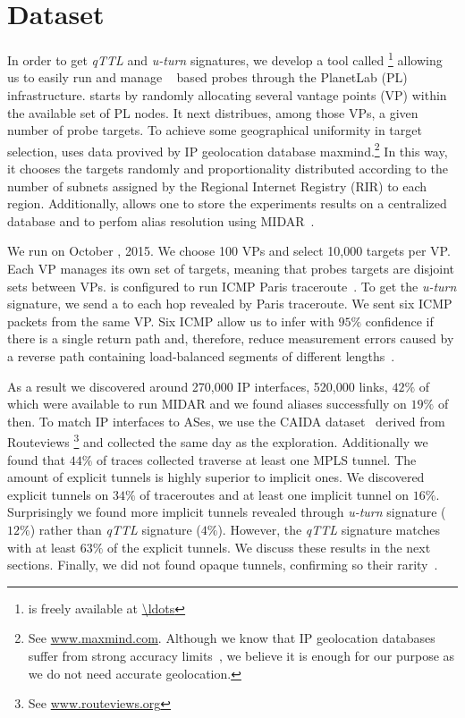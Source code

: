 \section{Dataset}\label{dataset}
In order to get \textit{qTTL} and \textit{u-turn} signatures, we develop a tool
called \magallanes\footnote{\magallanes is freely available at \url{\ldots}}
allowing us to easily run and manage \scamper~\cite{Luckie10} based probes
through the PlanetLab (PL) infrastructure.  \magallanes starts by randomly
allocating several vantage points (VP) within the available set of PL nodes.  It
next distribues, among those VPs, a given number of probe targets.
To achieve some geographical uniformity in target selection, \magallanes uses
data provived by IP geolocation database maxmind.\footnote{See
\url{www.maxmind.com}.  Although we know that IP geolocation databases suffer
from strong accuracy limits~\cite{geolocation}, we believe it is enough for our
purpose as we do not need accurate geolocation.}  In this way, it chooses the
targets randomly and proportionality distributed according to the number of
subnets assigned by the Regional Internet Registry (RIR) to each region.
Additionally, \magallanes allows one to store the experiments results on a
centralized database and to perfom alias resolution using MIDAR~\cite{Keys13}.

We run \magallanes on October , 2015.  We choose 100 VPs and select
10,000 targets per VP.  Each VP manages its own set of targets, meaning that
probes targets are disjoint sets between VPs.  \scamper is configured to run
ICMP Paris traceroute~\cite{BRICE06}.  To get the \textit{u-turn} signature,
we send a \ping to each hop revealed by Paris traceroute. We sent six
ICMP \echorequest packets from the same VP.  Six ICMP \echoreply allow us to
infer with $95\%$ confidence if there is a single return path and, 
therefore, reduce measurement errors caused by a reverse path containing
load-balanced segments of different lengths~\cite{BRICE07}. 

As a result we discovered around 270,000 IP interfaces,  520,000 links, $42\%$
of which were available to run MIDAR and we found aliases successfully on $19\%$
of then. To match IP interfaces to ASes, we use the CAIDA
dataset~\cite{caida_ref} derived from Routeviews \footnote{See
\url{www.routeviews.org}} and collected the same day as the exploration.  Additionally we found that $44\%$ of traces collected
traverse at least one MPLS tunnel.  The amount of explicit tunnels is highly
superior to implicit ones. We discovered explicit tunnels on $34\%$ of
traceroutes and at least one implicit tunnel on $16\%$. Surprisingly we found
more implicit tunnels revealed through \textit{u-turn} signature ($12\%$) rather
than \textit{qTTL} signature ($4\%$). However, the \textit{qTTL} signature
matches with at least $63\%$ of the explicit tunnels. We discuss these results
in the next sections. Finally, we did not found opaque tunnels, confirming so
their rarity~\cite{VAN2013}.

